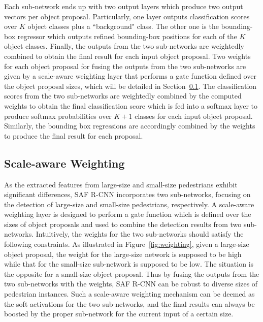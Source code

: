 \documentclass[journal]{IEEEtran}
\begin{document}
Each sub-network ends up with two output layers which produce two output vectors per object proposal. Particularly, one layer outputs classification scores over $K$ object classes plus a ``background" class. The other one is the bounding-box regressor which outputs refined bounding-box positions for each of the $K$ object classes. Finally, the outputs from the two sub-networks are weightedly combined to obtain the final result for each input object proposal. Two weights for each object proposal for fusing the outputs from the two sub-networks are given by a scale-aware weighting layer that performs a gate function defined over the object proposal sizes, which will be detailed in Section~\ref{sec:weight}. The classification scores from the two sub-networks are weightedly combined by the computed weights to obtain the final classification score which is fed into a softmax layer to produce softmax probabilities over $K+1$ classes for each input object proposal. Similarly, the bounding box regressions are accordingly combined by the weights to produce the final result for each proposal.

\subsection{Scale-aware Weighting}\label{sec:weight}
As the extracted features from large-size and small-size pedestrians exhibit significant differences, SAF R-CNN incorporates two sub-networks, focusing on the detection of large-size and small-size pedestrians, respectively. A scale-aware weighting layer is designed to perform a gate function which is defined over the sizes of object proposals and used to combine the detection results from two sub-networks. Intuitively, the weights for the two sub-networks should satisfy the following constraints. As illustrated in Figure~\ref{fig:weighting}, given a large-size object proposal, the weight for the large-size network is supposed to be high while that for the small-size sub-network is supposed to be low. The situation is the opposite for a small-size object proposal. Thus by fusing the outputs from the two sub-networks with the weights, SAF R-CNN can be robust to diverse sizes of pedestrian instances. Such a scale-aware weighting mechanism can be deemed as the soft activations for the two sub-networks, and the final results can always be boosted by the proper sub-network for the current input of a certain size.

\end{document}
